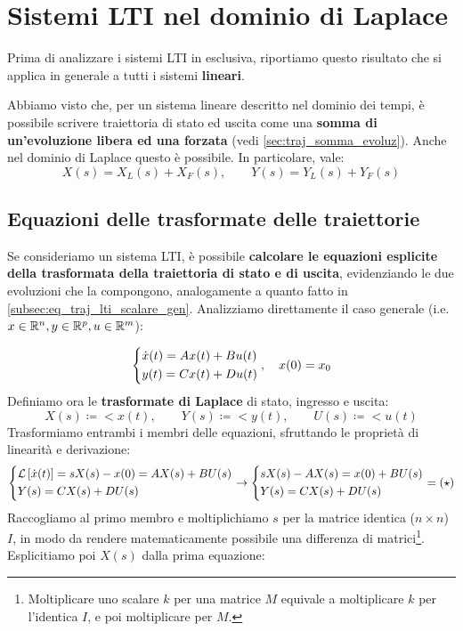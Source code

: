 \chapter{Sistemi LTI nel dominio di Laplace}
Prima di analizzare i sistemi LTI in esclusiva, riportiamo questo risultato che si applica in generale a tutti i sistemi \textbf{lineari}.
\begin{prop}
Abbiamo visto che, per un sistema lineare descritto nel dominio dei tempi, è possibile scrivere traiettoria di stato ed uscita come una \textbf{somma di un'evoluzione libera ed una forzata} (vedi \eqref{sec:traj_somma_evoluz}). Anche nel dominio di Laplace questo è possibile. In particolare, vale:
\begin{equation}
X(s) = X_L(s) + X_F(s), \quad \quad Y(s) = Y_L(s) + Y_F(s)
\end{equation}
\end{prop}

\section{Equazioni delle trasformate delle traiettorie}
Se consideriamo un sistema LTI, è possibile \textbf{calcolare le equazioni esplicite della trasformata della traiettoria di stato e di uscita}, evidenziando le due evoluzioni che la compongono, analogamente a quanto fatto in \eqref{subsec:eq_traj_lti_scalare_gen}. Analizziamo direttamente il caso generale (i.e.  $x \in \mathbb{R}^n, y \in \mathbb{R}^p, u \in \mathbb{R}^m$): 

\begin{equation*}
\begin{dcases}
\dot x(t) = Ax(t) + Bu(t) \\
y(t) = Cx(t) + Du(t)
\end{dcases}, \quad x(0) = x_0
\end{equation*}
Definiamo ora le \textbf{trasformate di Laplace} di stato, ingresso e uscita:
\begin{equation}
X(s) \coloneqq \lt{x(t)}, \quad \quad Y(s) \coloneqq \lt{y(t)}, \quad \quad U(s) \coloneqq \lt{u(t)}
\end{equation}
Trasformiamo entrambi i membri delle equazioni, sfruttando le proprietà di linearità e derivazione:
\begin{equation*}
\begin{dcases}
\mathcal{L}\left[ \dot x(t) \right] = sX(s) - x(0) = AX(s) + BU(s)\\
Y(s) = CX(s) + DU(s) 
\end{dcases} \rightarrow 
\begin{dcases}
sX(s) - AX(s) = x(0) + BU(s) \\
Y(s) = CX(s) + DU(s) 
\end{dcases} = (\star)
\end{equation*}
Raccogliamo al primo membro e moltiplichiamo $s$ per la matrice identica ($n \times n$) $I$, in modo da rendere matematicamente possibile una differenza di matrici\footnote{
Moltiplicare uno scalare $k$ per una matrice $M$ equivale a moltiplicare $k$ per l'identica $I$, e poi moltiplicare per $M$.}. Esplicitiamo poi $X(s)$ dalla prima equazione:

